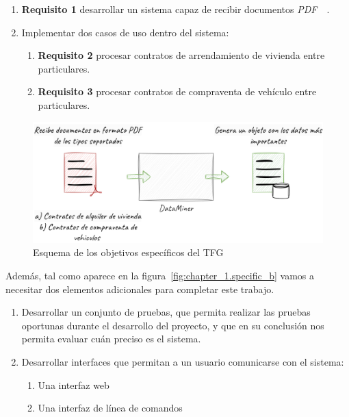 \begin{enumerate}
    \item
    \textbf{Requisito 1} desarrollar un sistema capaz de recibir documentos
    \textit{PDF}~\cite{url_adobe_pdf}~\label{req:transform_pdf_to_text}.
    \item
    Implementar dos casos de uso dentro del sistema:
    \begin{enumerate}
        \item
        \textbf{Requisito 2} procesar contratos de arrendamiento de vivienda entre
        particulares\label{req:residence_lease_agreement}.
        \item
        \textbf{Requisito 3} procesar contratos de compraventa de vehículo entre
        particulares\label{req:sale_and_purchase_agreement}.
    \end{enumerate}
\end{enumerate}

\begin{figure}[ht]
    \begin{center}
        \includegraphics[width=\textwidth]{chapter/1/images/chapter_1.specific_a}
        \caption{Esquema de los objetivos específicos del TFG}
        \label{fig:chapter_1.specific_a}
    \end{center}
\end{figure}

Además, tal como aparece en la figura~\ref{fig:chapter_1.specific_b} vamos a necesitar dos elementos adicionales para
completar este trabajo.

\begin{enumerate}
    \item Desarrollar un conjunto de pruebas, que permita realizar las pruebas oportunas durante el desarrollo del
    proyecto, y que en su conclusión nos permita evaluar cuán preciso es el sistema.
    \item Desarrollar interfaces que permitan a un usuario comunicarse con el sistema:
    \begin{enumerate}
        \item  Una interfaz web
        \item  Una interfaz de línea de comandos
    \end{enumerate}
\end{enumerate}

